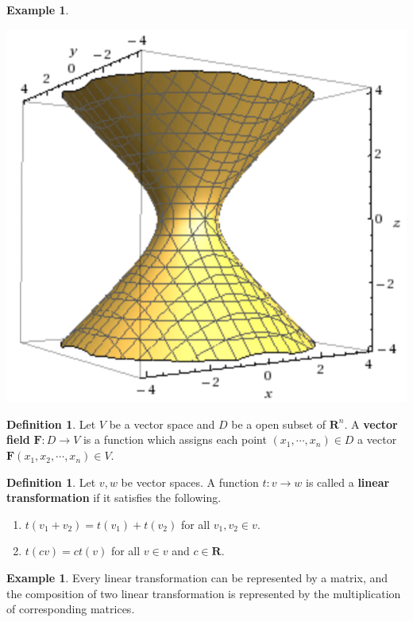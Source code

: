 \documentclass{beamer}
\theoremstyle{plain}
\theoremstyle{definition}
\newtheorem{defn}[thm]{Definition}
\newtheorem{exmp}[thm]{Example}
\begin{document}
\begin{frame}
\begin{exmp}
\begin{center}
	\includegraphics[scale=.13]{image/week-02-03}
	\end{center}
\end{exmp}
\end{frame}

\begin{frame}
\begin{defn}
	Let $V$ be a vector space and 
	$D$ be a open subset of $\mathbf R^n$.
	A \textbf{vector field} $\mathbf F:D\to V$ 
	is a function which assigns each point 
	$(x_1,\cdots,x_n)\in D$ a vector
	$\mathbf F(x_1,x_2,\cdots,x_n) \in V$.
\end{defn}
\begin{defn}
	Let $v,w$ be vector spaces. 
	A function $t:v\to w$ is called a 
	\textbf{linear transformation} 
	if it satisfies the following.
	\begin{enumerate}
		\item $t(v_1+v_2)=t(v_1)+t(v_2)$ 
		for all $v_1,v_2\in v$.
		\item $t(cv)= ct(v)$ for all $v\in v$ 
		and $c\in\mathbf R$.
	\end{enumerate}
\end{defn}
\begin{exmp}
	Every linear transformation can be represented by
	a matrix, and the composition of two linear
	transformation is represented by the multiplication
	of corresponding matrices.
\end{exmp}
\end{frame}
\end{document}
